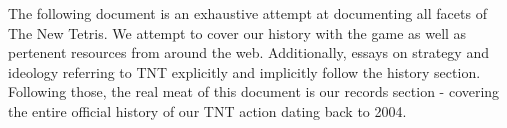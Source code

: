 The following document is an exhaustive attempt at documenting all facets of The New Tetris. We attempt to cover our history with the game as well as pertenent resources from around the web. Additionally, essays on strategy and ideology referring to TNT explicitly and implicitly follow the history section. Following those, the real meat of this document is our records section - covering the entire official history of our TNT action dating back to 2004.